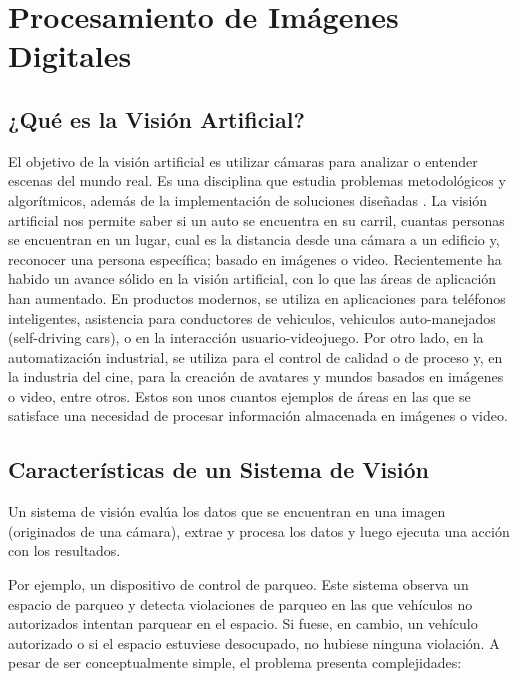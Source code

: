 \chapter{Procesamiento de Imágenes Digitales}

\section{¿Qué es la Visión Artificial?}
El objetivo de la visión artificial es utilizar cámaras para analizar o entender escenas del mundo real. Es una disciplina que estudia problemas metodológicos y algorítmicos, además de la implementación de soluciones diseñadas \cite{Klette2014-oo}.
La visión artificial nos permite saber si un auto se encuentra en su carril, cuantas personas se encuentran en un lugar, cual es la distancia desde una cámara a un edificio y, reconocer una persona específica; basado en imágenes o video.
Recientemente ha habido un avance sólido en la visión artificial, con lo que las áreas de aplicación han aumentado. En productos modernos, se utiliza en aplicaciones para teléfonos inteligentes, asistencia para conductores de vehiculos, vehiculos auto-manejados (self-driving cars), o en la interacción usuario-videojuego.  Por otro lado, en la automatización industrial, se utiliza para el control de calidad o de proceso y, en la industria del cine, para la creación de avatares y mundos basados en imágenes o video, entre otros.  Estos son unos cuantos ejemplos de áreas en las que se satisface una necesidad de procesar información almacenada en imágenes o video. 


\section{Características de un Sistema de Visión}
Un sistema de visión evalúa los datos que se encuentran en una imagen (originados de una cámara), extrae y procesa los datos y luego ejecuta una acción con los resultados.

Por ejemplo, un dispositivo de control de parqueo. Este sistema observa un espacio de parqueo y detecta violaciones de parqueo en las que vehículos no autorizados intentan parquear en el espacio. Si fuese, en cambio, un vehículo autorizado o si el espacio estuviese desocupado, no hubiese ninguna violación. A pesar de ser conceptualmente simple, el problema presenta complejidades:


